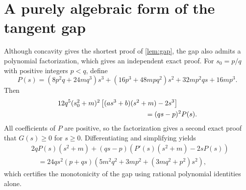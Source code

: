 \documentclass[11pt,reqno]{amsart}
\numberwithin{equation}{section}
\theoremstyle{definition}
\theoremstyle{remark}
\begin{document}
\section{A purely algebraic form of the tangent gap}\label{app:algebraic-gap}

Although concavity gives the shortest proof of \cref{lem:gap}, the gap also admits a polynomial factorization, which gives an independent exact proof. For $s_0=p/q$ with positive integers $p<q$, define
\[
 P(s)=(8p^{2}q+24mq^{3})s^{3}
 +(16p^{3}+48mpq^{2})s^{2}
 +32mp^{2}qs+16mp^{3}.
\]
Then
\begin{align*}
&12q^{5}(s_0^{2}+m)^{2}
 \left[(as^{3}+b)(s^{2}+m)-2s^{3}\right]\\
&\hspace{45mm}=(qs-p)^{2}P(s).
\end{align*}
All coefficients of $P$ are positive, so the factorization gives a second exact proof that $G(s)\geq0$ for $s\geq0$. Differentiating and simplifying yields
\begin{align*}
&2qP(s)(s^{2}+m)+(qs-p)\left(P'(s)(s^{2}+m)-2sP(s)\right)\\
&\quad=24qs^{2}(p+qs)
 \left(5m^{2}q^{2}+3mp^{2}+(3mq^{2}+p^{2})s^{2}\right),
\end{align*}
which certifies the monotonicity of the gap using rational polynomial identities alone.
\end{document}
